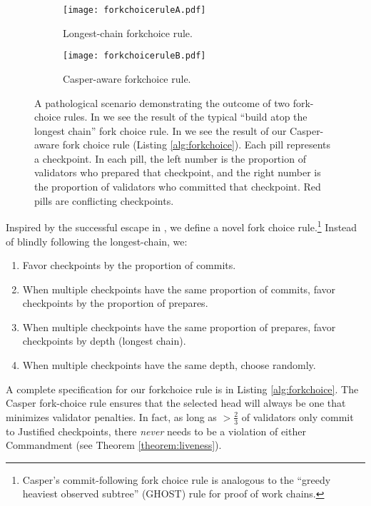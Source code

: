 \documentclass[12pt]{article}
\begin{document}
\begin{figure}[h!tb]
\centering
   \begin{subfigure}[b]{0.42\textwidth}
   \centering
\texttt{[image: forkchoiceruleA.pdf]}
	\caption{Longest-chain forkchoice rule.}
	\label{fig:forkchoice_a}	
	\end{subfigure} \hspace{0.3in} \begin{subfigure}[b]{0.42\textwidth}
   \centering
\texttt{[image: forkchoiceruleB.pdf]}
	\caption{Casper-aware forkchoice rule.}
	\label{fig:forkchoice_b}	
	\end{subfigure}

\caption{A pathological scenario demonstrating the outcome of two fork-choice rules.   In  we see the result of the typical ``build atop the longest chain'' fork choice rule.  In  we see the result of our Casper-aware fork choice rule (Listing \ref{alg:forkchoice}).  Each pill represents a checkpoint.  In each pill, the left number is the proportion of validators who prepared that checkpoint, and the right number is the proportion of validators who committed that checkpoint.  Red pills are conflicting checkpoints.}
\label{fig:forkchoice}
\end{figure}

Inspired by the successful escape in , we define a novel fork choice rule.\footnote{Casper's commit-following fork choice rule is analogous to the ``greedy heaviest observed subtree'' (GHOST) rule for proof of work chains\cite{sompolinsky2013accelerating}.} Instead of blindly following the longest-chain, we:

\begin{enumerate}
\item Favor checkpoints by the proportion of commits.
\item When multiple checkpoints have the same proportion of commits, favor checkpoints by the proportion of prepares.
\item When multiple checkpoints have the same proportion of prepares, favor checkpoints by depth (longest chain).
\item When multiple checkpoints have the same depth, choose randomly.
\end{enumerate}

A complete specification for our forkchoice rule is in Listing \ref{alg:forkchoice}.  The Casper fork-choice rule ensures that the selected head will always be one that minimizes validator penalties.  In fact, as long as $> \frac{2}{3}$ of validators only commit to Justified checkpoints, there \emph{never} needs to be a violation of either Commandment (see Theorem \ref{theorem:liveness}).
\end{document}
